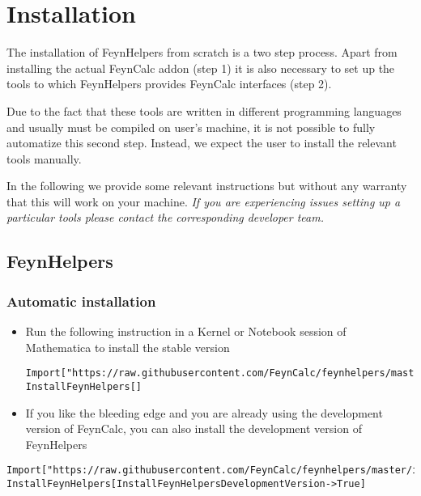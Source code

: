 \documentclass[../FeynHelpersManual.tex]{subfiles}
\begin{document}
\hypertarget{installation}{
\section{Installation}\label{installation}}

The installation of FeynHelpers from scratch is a two step process.
Apart from installing the actual FeynCalc addon (step 1) it is also
necessary to set up the tools to which FeynHelpers provides FeynCalc
interfaces (step 2).

Due to the fact that these tools are written in different programming
languages and usually must be compiled on user's machine, it is not
possible to fully automatize this second step. Instead, we expect the
user to install the relevant tools manually.

In the following we provide some relevant instructions but without any
warranty that this will work on your machine. \emph{If you are
experiencing issues setting up a particular tools please contact the
corresponding developer team.}

\hypertarget{feynhelpers}{%
\subsection{FeynHelpers}\label{feynhelpers}}

\hypertarget{automatic-installation}{%
\subsubsection{Automatic installation}\label{automatic-installation}}

\begin{itemize}
\item
  Run the following instruction in a Kernel or Notebook session of
  Mathematica to install the stable version

\begin{verbatim}
Import["https://raw.githubusercontent.com/FeynCalc/feynhelpers/master/install.m"]
InstallFeynHelpers[]
\end{verbatim}
\item
  If you like the bleeding edge and you are already using the
  development version of FeynCalc, you can also install the development
  version of FeynHelpers
\end{itemize}

\begin{verbatim}
Import["https://raw.githubusercontent.com/FeynCalc/feynhelpers/master/install.m"]
InstallFeynHelpers[InstallFeynHelpersDevelopmentVersion->True]
\end{verbatim}
\end{document}
